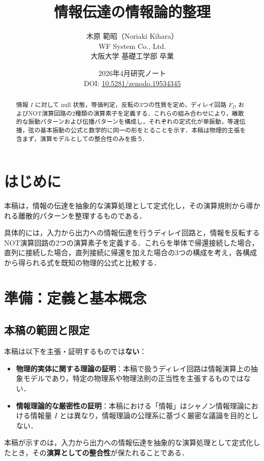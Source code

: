 \documentclass[12pt,a4paper]{ltjsarticle}
\title{情報伝達の情報論的整理}
\author{木原 範昭（Noriaki Kihara）\\
WF System Co., Ltd.\\
大阪大学 基礎工学部 卒業}
\date{2026年4月\quad 研究ノート\\[4pt]
DOI: \href{https://doi.org/10.5281/zenodo.19534345}{10.5281/zenodo.19534345}}
\begin{document}
\maketitle

\begin{abstract}
情報 $I$ に対して null 状態，等価判定，反転の3つの性質を定め，ディレイ回路 $F_D$ およびNOT演算回路の2種類の演算素子を定義する．これらの組み合わせにより，離散的な振動パターンおよび伝播パターンを構成し，それぞれの定式化が単振動，等速伝播，弦の基本振動の公式と数学的に同一の形をとることを示す．本稿は物理的主張を含まず，演算モデルとしての整合性のみを扱う．
\end{abstract}

\section{はじめに}

本稿は，情報の伝達を抽象的な演算処理として定式化し，その演算規則から導かれる離散的パターンを整理するものである．

具体的には，入力から出力への情報伝達を行うディレイ回路と，情報を反転するNOT演算回路の2つの演算素子を定義する．これらを単体で帰還接続した場合，直列に接続した場合，直列接続に帰還を加えた場合の3つの構成を考え，各構成から得られる式を既知の物理的公式と比較する．

\section{準備：定義と基本概念}

\subsection{本稿の範囲と限定}

本稿は以下を主張・証明するものでは\textbf{ない}：

\begin{itemize}
  \item \textbf{物理的実体に関する理論の証明}：本稿で扱うディレイ回路は情報演算上の抽象モデルであり，特定の物理系や物理法則の正当性を主張するものではない．
  \item \textbf{情報理論的な厳密性の証明}：本稿における「情報」はシャノン情報理論における情報量 $I$ とは異なり，情報理論の公理系に基づく厳密な議論を目的としない．
\end{itemize}

本稿が示すのは，入力から出力への情報伝達を抽象的な演算処理として定式化したとき，その\textbf{演算としての整合性}が保たれることである．
\end{document}

